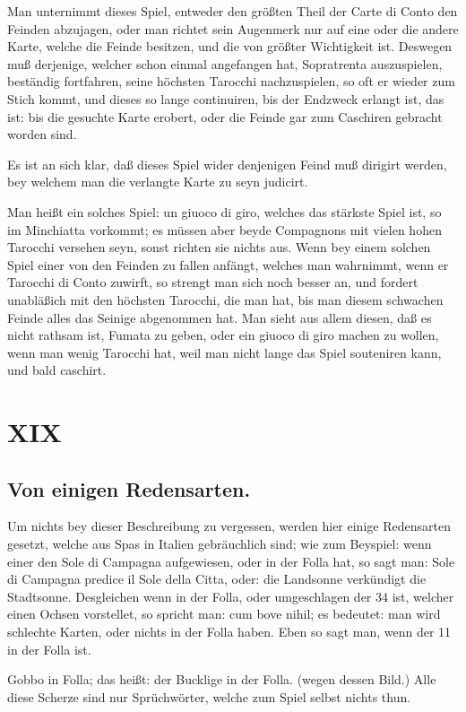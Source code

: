 \documentclass[11pt,a6paper,twoside]{article}
\begin{document}
Man unternimmt dieses Spiel, entweder den größten Theil der Carte di Conto den Feinden abzujagen, oder man richtet sein Augenmerk nur auf eine oder die andere Karte, welche die Feinde besitzen, und die von größter Wichtigkeit ist. Deswegen muß derjenige, welcher schon einmal angefangen hat, Sopratrenta auszuspielen, beständig fortfahren, seine höchsten Tarocchi nachzuspielen, so oft er wieder zum Stich kommt, und dieses so lange continuiren, bis der Endzweck erlangt ist, das ist: bis die gesuchte Karte erobert, oder die Feinde gar zum Caschiren gebracht worden sind.

Es ist an sich klar, daß dieses Spiel wider denjenigen Feind muß dirigirt werden, bey welchem man die verlangte Karte zu seyn judicirt.

Man heißt ein solches Spiel: un giuoco di giro, welches das stärkste Spiel ist, so im Minchiatta vorkommt; es müssen aber beyde Compagnons mit vielen hohen Tarocchi versehen seyn, sonst richten sie nichts aus. Wenn bey einem solchen Spiel einer von den Feinden zu fallen anfängt, welches man wahrnimmt, wenn er Tarocchi di Conto zuwirft, so strengt man sich noch besser an, und fordert unabläßich mit den höchsten Tarocchi, die man hat, bis man diesem schwachen Feinde alles das Seinige abgenommen hat. Man sieht aus allem diesen, daß es nicht rathsam ist, Fumata zu geben, oder ein giuoco di giro machen zu wollen, wenn man wenig Tarocchi hat, weil man nicht lange das Spiel souteniren kann, und bald caschirt.

\section{XIX}
\subsection{Von einigen Redensarten.}

Um nichts bey dieser Beschreibung zu vergessen, werden hier einige Redensarten gesetzt, welche aus Spas in Italien gebräuchlich sind; wie zum Beyspiel: wenn einer den Sole di Campagna aufgewiesen, oder in der Folla hat, so sagt man: Sole di Campagna predice il Sole della Citta, oder: die Landsonne verkündigt die Stadtsonne. Desgleichen wenn in der Folla, oder umgeschlagen der 34 ist, welcher einen Ochsen vorstellet, so spricht man: cum bove nihil; es bedeutet: man wird schlechte Karten, oder nichts in der Folla haben. Eben so sagt man, wenn der 11 in der Folla ist.

Gobbo in Folla; das heißt: der Bucklige in der Folla. (wegen dessen Bild.) Alle diese Scherze sind nur Sprüchwörter, welche zum Spiel selbst nichts thun.
\end{document}
